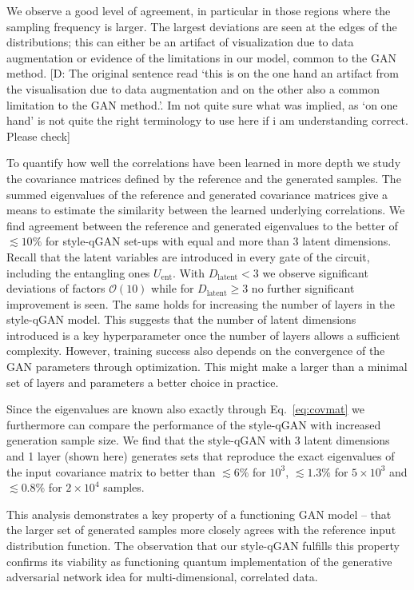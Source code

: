 \documentclass[twocolumn,preprintnumbers,superscriptaddress]{revtex4-2}
\newcommand{\commentDMG}[1]{{\color{orange} {[D: #1]}}}
\begin{document}
We observe a good level of agreement, in particular in those regions where the
sampling frequency is larger. The largest deviations are seen at the edges of the distributions; this can either be an artifact of visualization due to data augmentation or evidence of the limitations in our model, common to the GAN method.\commentDMG{The original sentence read `this is on the one hand an artifact from the visualisation due to data augmentation and on the other also a common limitation to the GAN method.'. Im not quite sure what was implied, as `on one hand' is not quite the right terminology to use here if i am understanding correct. Please check}

To quantify how well the correlations have been learned in more depth we study the covariance matrices defined by the reference and the generated samples. The summed eigenvalues of the reference and generated covariance matrices give a means to estimate the similarity between the learned underlying correlations. We find agreement between the reference and generated eigenvalues to the better of $\lesssim 10\%$ for style-qGAN set-ups with equal and more than 3 latent dimensions. Recall that the latent variables are introduced in every gate of the circuit, including the entangling ones $U_{\mathrm{ent}}$.  With $D_{\mathrm{latent}}< 3$ we observe significant deviations of factors $\mathcal{O}(10)$ while for $D_{\mathrm{latent}}\geq 3$ no further significant improvement is seen. The same holds for increasing the number of layers in the style-qGAN model. This suggests that the number of latent dimensions introduced is a key hyperparameter once the number of layers allows a sufficient complexity. However, training success also depends on the convergence of the GAN parameters through optimization. This might make a larger than a minimal set of layers and parameters a better choice in practice.

Since the eigenvalues are known also exactly through Eq.~\ref{eq:covmat} we furthermore can compare the performance of the style-qGAN with increased generation sample size. We find that the style-qGAN with 3 latent dimensions and 1 layer (shown here) generates sets that reproduce the exact eigenvalues of the input covariance matrix to better than $\lesssim 6\%$ for $10^3$, $\lesssim 1.3\%$ for $5\times10^3$ and $\lesssim 0.8\%$ for $2\times10^4$ samples.

This analysis demonstrates a key property of a functioning GAN model -- that the larger set of generated samples more closely agrees with the reference input distribution function. The observation that our style-qGAN fulfills this property confirms its viability as functioning quantum implementation of the generative adversarial network idea for multi-dimensional, correlated data.
\end{document}
